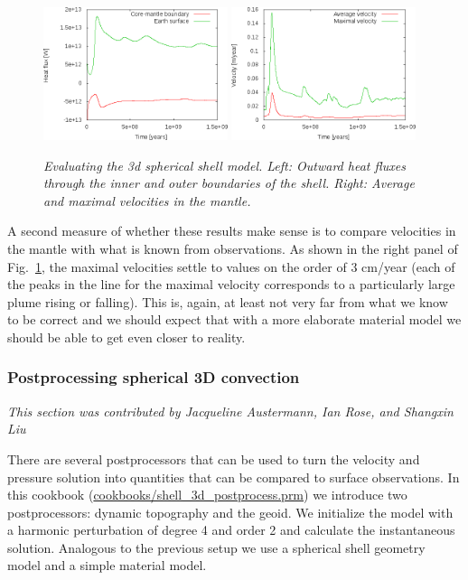 \documentclass{article}
\begin{document}
\begin{figure}
  \includegraphics[width=0.48\textwidth]{cookbooks/shell_simple_3d/doc/heatflux.png}
  \hfill
  \includegraphics[width=0.48\textwidth]{cookbooks/shell_simple_3d/doc/velocities.png}
  \caption{\it Evaluating the 3d spherical shell model. Left: Outward heat
  fluxes through the inner and outer boundaries of the shell. Right: Average
  and maximal velocities in the mantle.}
  \label{fig:shell-simple-3d-eval}
\end{figure}

A second measure of whether these results make sense is to compare velocities in
the mantle with what is known from observations. As shown in the right panel of
Fig.~\ref{fig:shell-simple-3d-eval}, the maximal velocities settle to values on
the order of 3 cm/year (each of the peaks in the line for the maximal velocity
corresponds to a particularly large plume rising or falling). This is, again, at
least not very far from what we know to be correct and we should expect that
with a more elaborate material model we should be able to get even closer to
reality.

\subsubsection{Postprocessing spherical 3D convection}
\label{sec:cookbooks-shell_3d_postprocess.prm}
\textit{This section was contributed by Jacqueline Austermann, Ian Rose, and Shangxin Liu}


There are several postprocessors that can be used to turn the velocity
and pressure solution into quantities that can be compared to surface
observations. In this cookbook (\url{cookbooks/shell_3d_postprocess.prm})
we introduce two postprocessors: dynamic topography and the geoid.
We initialize the model with a harmonic
perturbation of degree 4 and order 2 and calculate the
instantaneous solution. Analogous to the previous setup we use a spherical
shell geometry model and a simple material model.
\end{document}
